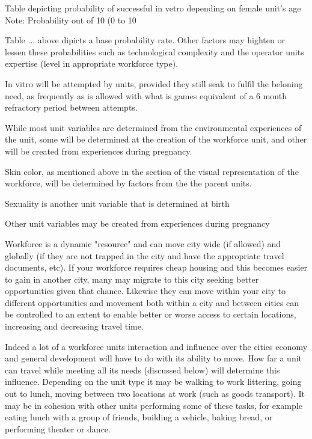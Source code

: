 Table depicting probability of successful in vetro depending on female unit's age
Note: Probability out of 10 (0 to 10

Table ... above dipicts a base probability rate. Other factors may highten or lessen these probabilities such as technological complexity and the operator units expertise (level in appropriate workforce type).

In vitro will be attempted by units, provided they still seak to fulfil the beloning need, as frequently as is allowed with what is games equivalent of a 6 month refractory period between attempts.


While most unit variables are determined from the environmental experiences of the unit, some will be determined at the creation of the workforce unit, and other will be created from experiences during pregnancy.

Skin color, as mentioned above in the section of the visual representation of the workforce, will be determined by factors from the the parent units.

Sexuality is another unit variable that is determined at birth

Other unit variables may be created from experiences during pregnancy





Workforce is a dynamic "resource" and can move city wide (if allowed) and globally (if they are not trapped in the city and have the appropriate travel documents, etc). If your workforce requires cheap housing and this becomes easier to gain in another city, many may migrate to this city seeking better opportunities given that chance. Likewise they can move within your city to different opportunities and movement both within a city and between cities can be controlled to an extent to enable better or worse access to certain locations, increasing and decreasing travel time.

Indeed a lot of a workforce units interaction and influence over the cities economy and general development will have to do with its ability to move. How far a unit can travel while meeting all its needs (discussed below) will determine this influence. Depending on the unit type it may be walking to work littering, going out to lunch, moving between two locations at work (such as goods transport). It may be in cohesion with other units performing some of these tasks, for example eating lunch with a group of friends, building a vehicle, baking bread, or performing theater or dance. 

